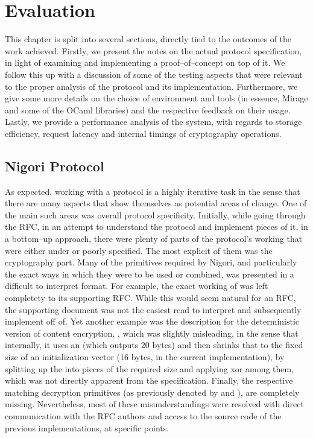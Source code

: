 \chapter{Evaluation} \label{chapter:evaluation}
This chapter is split into several sections, directly tied to the outcomes of the work achieved.
Firstly, we present the notes on the actual protocol specification, in light of examining and implementing a proof--of--concept on top of it.
We follow this up with a discussion of some of the testing aspects that were relevant to the proper analysis of the protocol and its implementation.
Furthermore, we give some more details on the choice of environment and tools (in essence, Mirage and some of the OCaml libraries) and the respective feedback on their usage.
Lastly, we provide a performance analysis of the system, with regards to storage efficiency, request latency and internal timings of cryptography operations.

\section{Nigori Protocol} \label{sec:evaluation:protocol}
As expected, working with a \wip protocol is a highly iterative task in the sense that there are many aspects that show themselves as potential areas of change.
One of the main such areas was overall protocol specificity.
Initially, while going through the RFC, in an attempt to understand the protocol and implement pieces of it, in a bottom--up approach, there were plenty of parts of the protocol's working that were either under or poorly specified.
The most explicit of them was the cryptography part.
Many of the primitives required by Nigori, and particularly the exact ways in which they were to be used or combined, was presented in a difficult to interpret format.
For example, the exact working of  was left completety to its supporting RFC.
While this would seem natural for an RFC, the supporting document was not the easiest read to interpret and subsequently implement off of.
Yet another example was the description for the deterministic version of content encryption, , which was slightly misleading, in the sense that internally, it uses an  (which outputs 20 bytes) and then shrinks that to the fixed size of an  initialization vector (16 bytes, in the current implementation), by splitting up the  into pieces of the required size and applying xor among them, which was not directly apparent from the specification.
Finally, the respective matching decryption primitives (as previously denoted by  and ), are completely missing.
Nevertheless, most of these misunderstandings were resolved with direct communication with the RFC authors and access to the source code of the previous implementations, at specific points.

